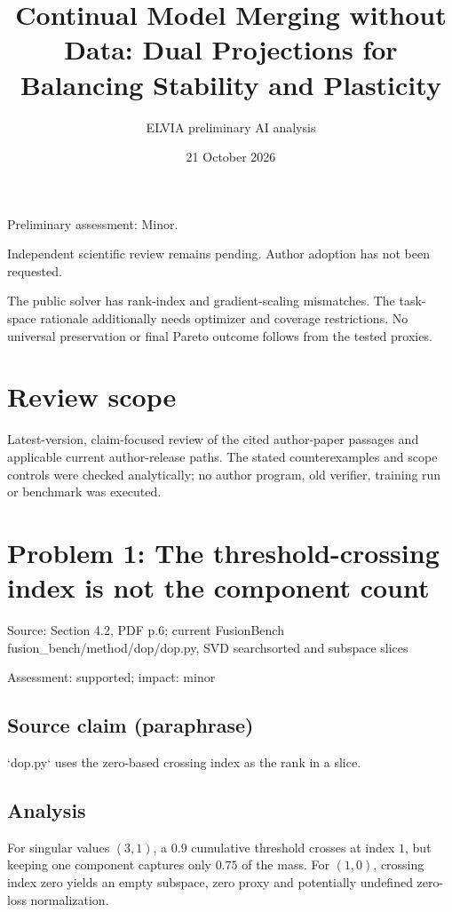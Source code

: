 \documentclass[11pt]{article}
\begin{document}
\title{Continual Model Merging without Data: Dual Projections for Balancing Stability and Plasticity}

\author{ELVIA preliminary AI analysis}\date{21 October 2026}\maketitle

Preliminary assessment: Minor.\par

Independent scientific review remains pending. Author adoption has not been requested.

The public solver has rank-index and gradient-scaling mismatches. The task-space rationale additionally needs optimizer and coverage restrictions. No universal preservation or final Pareto outcome follows from the tested proxies.

\section*{Review scope}

Latest-version, claim-focused review of the cited author-paper passages and applicable current author-release paths. The stated counterexamples and scope controls were checked analytically; no author program, old verifier, training run or benchmark was executed.

\section*{Problem 1: The threshold-crossing index is not the component count}

Source: Section 4.2, PDF p.6; current FusionBench fusion\_bench/method/dop/dop.py, SVD searchsorted and subspace slices

Assessment: supported; impact: minor

\subsection*{Source claim (paraphrase)}

`dop.py` uses the zero-based crossing index as the rank in a slice.

\subsection*{Analysis}

For singular values \((3,1)\), a \(0.9\) cumulative threshold crosses at index \(1\), but keeping one component captures only \(0.75\) of the mass. For \((1,0)\), crossing index zero yields an empty subspace, zero proxy and potentially undefined zero-loss normalization.
\end{document}
